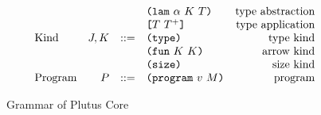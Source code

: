 \documentclass[../main.tex]{subfiles}
\begin{document}
\begin{figure*}[t]
\[\begin{array}{lrclr}
                                  &     &     & \texttt{(} \texttt{lam} ~ \alpha ~ K ~ T \texttt{)}        & \textrm{type abstraction}\\
                                  &     &     & \texttt{[} T ~ T^+ \texttt{]}              & \textrm{type application}\\
        \textrm{Kind}             & J,K & ::= & \texttt{(} \texttt{type} \texttt{)}{}                   & \textrm{type kind}\\
                                  &     &     & \texttt{(} \texttt{fun} ~ K ~ K \texttt{)}                & \textrm{arrow kind}\\
                                  &     &     & \texttt{(} \texttt{size} \texttt{)}{}                   & \textrm{size kind}\\
        \textrm{Program}          & P   & ::= & \texttt{(} \texttt{program} ~ v ~ M \texttt{)}             & \textrm{program}\\

    \end{array}\]
    \caption{Grammar of Plutus Core}
    \label{fig:Plutus_core_grammar}
\end{figure*}
\end{document}
